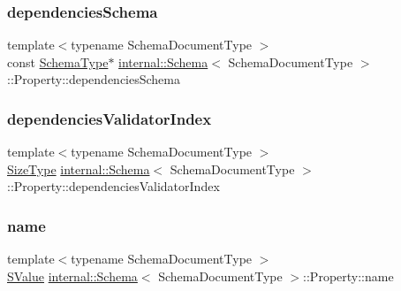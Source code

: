 \mbox{\label{structinternal_1_1Schema_1_1Property_a422e3f9c2fad29f3f8c3ce3be01430ab}} 
\subsubsection{\texorpdfstring{dependencies\+Schema}{dependenciesSchema}}
{\footnotesize\ttfamily template$<$typename Schema\+Document\+Type $>$ \\
const \hyperlink{classinternal_1_1Schema_ac2556ebf7a7db971e1c1c0f76eb5786e}{Schema\+Type}$\ast$ \hyperlink{classinternal_1_1Schema}{internal\+::\+Schema}$<$ Schema\+Document\+Type $>$\+::Property\+::dependencies\+Schema}

\mbox{\label{structinternal_1_1Schema_1_1Property_a8fe17f87aa205e912f3769873168224a}} 
\subsubsection{\texorpdfstring{dependencies\+Validator\+Index}{dependenciesValidatorIndex}}
{\footnotesize\ttfamily template$<$typename Schema\+Document\+Type $>$ \\
\hyperlink{rapidjson_8h_a5ed6e6e67250fadbd041127e6386dcb5}{Size\+Type} \hyperlink{classinternal_1_1Schema}{internal\+::\+Schema}$<$ Schema\+Document\+Type $>$\+::Property\+::dependencies\+Validator\+Index}

\mbox{\label{structinternal_1_1Schema_1_1Property_ace21cf3e96710639f11dba3e3d011670}} 
\subsubsection{\texorpdfstring{name}{name}}
{\footnotesize\ttfamily template$<$typename Schema\+Document\+Type $>$ \\
\hyperlink{classinternal_1_1Schema_ab3a07540a27d4cc2b0e260290c5c5771}{S\+Value} \hyperlink{classinternal_1_1Schema}{internal\+::\+Schema}$<$ Schema\+Document\+Type $>$\+::Property\+::name}

